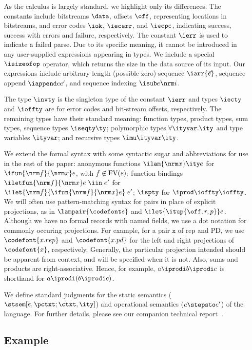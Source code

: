 As the calculus is largely standard, we highlight only its
differences. The constants include bitstreams $\data$, offsets $\off$,
representing locations in bitstreams, and error codes $\iok$,
$\iecerr$, and $\iecpc$, indicating success, success with errors and
failure, respectively. The constant $\ierr$ is used to indicate a
failed parse.  Due to its specific meaning, it cannot be introduced in
any user-supplied expressions appearing in \ddc{} types. We include a
special $\isizeofop$ operator, which returns the size in the data
source of its input. Our expressions include arbitrary length
(possible zero) sequence $\iarr{\vec e}$, sequence append $\iappend e
{e'}$, and sequence indexing $\isub e {\nrm i}$.

The type $\invty$ is the singleton type of the constant $\ierr$ and
types $\iecty$ and $\ioffty$ are for error codes and bit-stream
offsets, respectively. The remaining types have their standard
meaning: function types, product types, sum types, sequence types
$\iseqty \ty$; polymorphic types $\forall \ityvar.\ity$ and type
variables $\ityvar$; and recursive types $\imu \ityvar \ity$.

We extend the formal syntax with some syntactic sugar and
abbreviations for use in the rest of the paper: anonymous functions
$\ilam {\nrm x} \ity e$ for $\ifun {\nrm f} {\nrm x} e$, with $f
\not\in {\rm FV}(e)$; function bindings $\iletfun {\nrm f} {\nrm x} e
\; \iin \; e'$ for $\ilet {\nrm f} {\ifun {\nrm f} {\nrm x} e} \; e'$;
$\ispty$ for $\iprod \ioffty \ioffty$.  We will often use
pattern-matching syntax for pairs in place of explicit projections, as
in $\lampair{\codefont e}$ and $\ilet {\itup{\off,r,p}} e$.  Although
we have no formal records with named fields, we use a dot notation for
commonly occuring projections. For example, for a pair $\mathtt x$ of
rep and PD, we use $\codefont{x.rep}$ and $\codefont{x.pd}$ for the
left and right projections of $\codefont{x}$, respectively. Generally,
the particular projection intended should be apparent from context,
and will be specified when it is not. Also, sums and products are
right-associative. Hence, for example, $a \iprodi b \iprodi c$ is
shorthand for $a \iprodi (b \iprodi c)$.

We define standard judgments for the static semantics
($\stsem[e,{\pctxt;\ctxt},\ity]$) and operational semantics ($e
\stepsto e'$) of the \implang{} language. For further details, please
see our companion technical report~\cite{fisher+:pads-semantics-ext}.

\subsection{Example}

